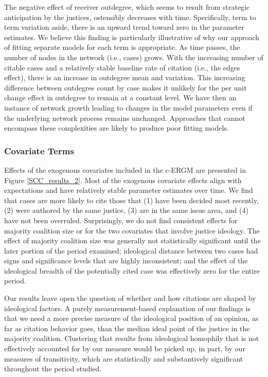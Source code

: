 \documentclass{cup-pan}
\begin{document}
The negative effect of receiver outdegree, which seems to result from strategic anticipation by the justices, ostensibly decreases with time. Specifically, term to term variation aside, there is an upward trend toward zero in the parameter estimates. We believe this finding is particularly illustrative of why our approach of fitting separate models for each term is appropriate. As time passes, the number of nodes in the network (i.e., cases) grows. With the increasing number of citable cases and a relatively stable baseline rate of citation (i.e., the edges effect), there is an increase in outdegree mean and variation. This increasing difference between outdegree count by case makes it unlikely for the per unit change effect in outdegree to remain at a constant level. We have then an instance of network growth leading to changes in the model parameters even if the underlying network process remains unchanged. Approaches that cannot encompass these complexities are likely to produce poor fitting models.

\subsubsection{Covariate Terms}
Effects of the exogenous covariates included in the c-ERGM are presented in Figure \ref{SCC_results_2}. Most of the exogenous covariate effects align with expectations and have relatively stable parameter estimates over time. We find that cases are more likely to cite those that (1) have been decided most recently, (2) were authored by the same justice, (3) are in the same issue area, and (4) have not been overruled. Surprisingly, we do not find consistent effects for majority coalition size or for the two covariates that involve justice ideology. The effect of majority coalition size was generally not statistically significant until the later portion of the period examined; ideological distance between two cases had signs and significance levels that are highly inconsistent; and the effect of the ideological breadth of the potentially cited case was effectively zero for the entire period. 

Our results leave open the question of whether and how citations are shaped by ideological factors. A purely measurement-based explanation of our findings is that we need a more precise measure of the ideological position of an opinion, as far as citation behavior goes, than the median ideal point of the justice in the majority coalition. Clustering that results from ideological homophily that is not effectively accounted for by our measure would be picked up, in part, by our measures of transitivity, which are statistically and substantively significant throughout the period studied. 
\end{document}
